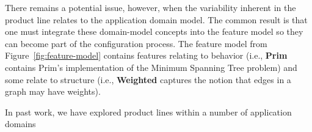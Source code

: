 There remains a potential issue, however, when the variability inherent in the product line relates to the application domain model. The common result is that one must integrate these domain-model concepts into the feature model so they can become part of the configuration process. The feature model from Figure~\ref{fig:feature-model} contains features relating to behavior (i.e., \textbf{Prim} contains Prim's implementation of the Minimum Spanning Tree problem) and some relate to structure (i.e., \textbf{Weighted} captures the notion that edges in a graph may have weights). 

In past work, we have explored product lines within a number of application domains~\cite{Heineman:2015:TMO:2791060.2791076,PEPM18}

%
%
%
%
%






